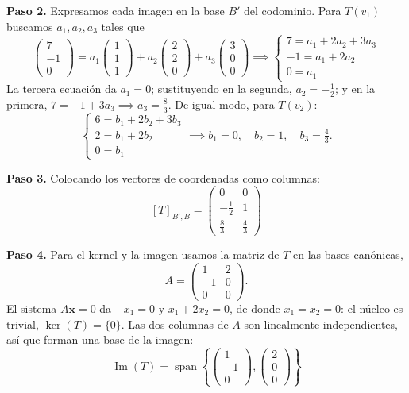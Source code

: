 \begin{example}
\begin{myproof}
\textbf{Paso 2.} Expresamos cada imagen en la base $B'$ del codominio. Para $T(v_1)$ buscamos $a_1, a_2, a_3$ tales que
\[
\begin{pmatrix} 7 \\ -1 \\ 0 \end{pmatrix} = a_1 \begin{pmatrix} 1 \\ 1 \\ 1 \end{pmatrix} + a_2 \begin{pmatrix} 2 \\ 2 \\ 0 \end{pmatrix} + a_3 \begin{pmatrix} 3 \\ 0 \\ 0 \end{pmatrix}
\implies
\begin{cases}
7 = a_1 + 2a_2 + 3a_3 \\
-1 = a_1 + 2a_2 \\
0 = a_1
\end{cases}
\]
La tercera ecuación da $a_1 = 0$; sustituyendo en la segunda, $a_2 = -\frac{1}{2}$; y en la primera, $7 = -1 + 3a_3 \implies a_3 = \frac{8}{3}$. De igual modo, para $T(v_2)$:
\[
\begin{cases}
6 = b_1 + 2b_2 + 3b_3 \\
2 = b_1 + 2b_2 \\
0 = b_1
\end{cases}
\implies b_1 = 0,\quad b_2 = 1,\quad b_3 = \tfrac{4}{3}.
\]

\textbf{Paso 3.} Colocando los vectores de coordenadas como columnas:
\[
\boxed{[T]_{B',B} = \begin{pmatrix}
0 & 0 \\
-\frac{1}{2} & 1 \\
\frac{8}{3} & \frac{4}{3}
\end{pmatrix}}
\]

\textbf{Paso 4.} Para el kernel y la imagen usamos la matriz de $T$ en las bases canónicas,
\[
A = \begin{pmatrix}
1 & 2 \\
-1 & 0 \\
0 & 0
\end{pmatrix}.
\]
El sistema $A\mathbf{x} = 0$ da $-x_1 = 0$ y $x_1 + 2x_2 = 0$, de donde $x_1 = x_2 = 0$: el núcleo es trivial, $\boxed{\ker(T) = \{0\}}$. Las dos columnas de $A$ son linealmente independientes, así que forman una base de la imagen:
\[
\boxed{\operatorname{Im}(T) = \operatorname{span}\left\{ \begin{pmatrix}1\\-1\\0\end{pmatrix}, \begin{pmatrix}2\\0\\0\end{pmatrix} \right\}}
\]
\end{myproof}
\end{example}
